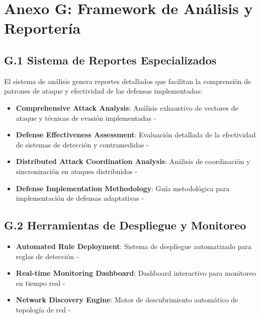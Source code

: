 \section*{Anexo G: Framework de Análisis y Reportería}

\subsection*{G.1 Sistema de Reportes Especializados}
El sistema de análisis genera reportes detallados que facilitan la comprensión de patrones de ataque y efectividad de las defensas implementadas:
\begin{itemize}
    \item \textbf{Comprehensive Attack Analysis}: Análisis exhaustivo de vectores de ataque y técnicas de evasión implementadas - 
    \item \textbf{Defense Effectiveness Assessment}: Evaluación detallada de la efectividad de sistemas de detección y contramedidas - 
    \item \textbf{Distributed Attack Coordination Analysis}: Análisis de coordinación y sincronización en ataques distribuidos - 
    \item \textbf{Defense Implementation Methodology}: Guía metodológica para implementación de defensas adaptativas - 
\end{itemize}

\subsection*{G.2 Herramientas de Despliegue y Monitoreo}
\begin{itemize}
    \item \textbf{Automated Rule Deployment}: Sistema de despliegue automatizado para reglas de detección - 
    \item \textbf{Real-time Monitoring Dashboard}: Dashboard interactivo para monitoreo en tiempo real - 
    \item \textbf{Network Discovery Engine}: Motor de descubrimiento automático de topología de red - 
\end{itemize}

